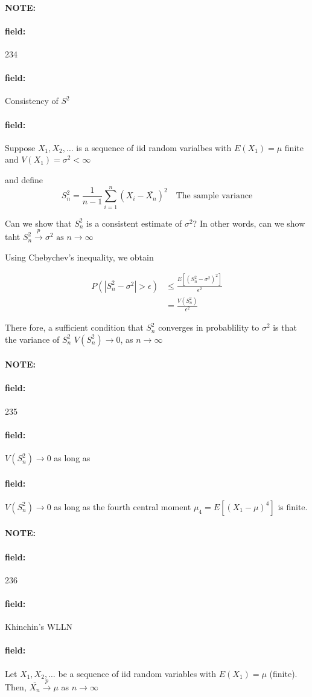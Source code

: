 \documentclass[12pt]{article}
\newenvironment{note}{\paragraph{NOTE:}}{}
\newenvironment{field}{\paragraph{field:}}{}
\begin{document}
\begin{note} \begin{field} \tiny 234 \end{field}
  \begin{field}
    Consistency of $S^2$
  \end{field}
  \begin{field}
    Suppose $X_1, X_2, \ldots$ is a sequence of iid random varialbes with $E(X_1) = \mu$ finite and $V(X_1) = \sigma^2 < \infty$

    and define $$ S_n^2 = \frac{1}{n-1}\sum_{i = 1}^n(X_i - \bar{X_n})^2 \quad \text{The sample variance}$$

    Can we show that $S_n^2$ is a consistent estimate of $\sigma^2$? In other words, can we show taht $S_n^2 \overset{p}{\to} \sigma^2 \text{ as } n \to \infty$

    Using Chebychev's inequality, we obtain

    \begin{align*}
      P(|S_n^2 - \sigma^2| > \epsilon ) &\leq \frac{E[(S_n^2 - \sigma^2)^2]}{\epsilon^2}\\
      &= \frac{V(S_n^2)}{\epsilon^2}
    \end{align*}

    There fore, a sufficient condition that $S_n^2$ converges in probablility to $\sigma^2$ is that the variance of $S_n^2$  $V(S_n^2) \to 0$, as $n \to \infty$
  \end{field}
\end{note}

\begin{note} \begin{field} \tiny 235 \end{field}
  \begin{field}
    $V(S_n^2) \to 0$ as long as
  \end{field}
  \begin{field}
    $V(S_n^2) \to 0$ as long as the fourth central moment $\mu_4 = E[(X_1 - \mu)^4]$ is finite.
  \end{field}
\end{note}

\begin{note} \begin{field} \tiny 236 \end{field}
  \begin{field}
    Khinchin's WLLN
  \end{field}
  \begin{field}
    Let $X_1, X_2, \ldots$ be a sequence of iid random variables with $E(X_1) = \mu$ (finite). Then, $\bar{X_n} \overset{p}{\to} \mu$ as $n \to \infty$
  \end{field}
\end{note}
\end{document}
